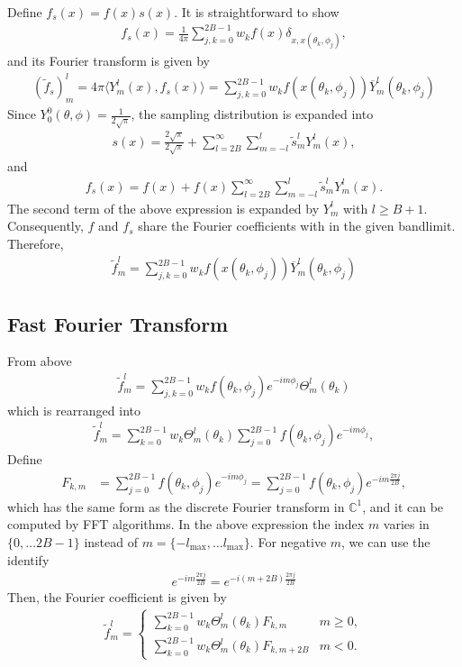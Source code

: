 \documentclass[onecolumn,11pt]{IEEEtran}
\newcommand{\pair}[1]{\ensuremath{\langle #1 \rangle}}
\begin{document}
Define $f_s(x)= f(x) s(x)$. It is straightforward to show
\begin{align*}
    f_s(x) = \frac{1}{4\pi}\sum_{j,k=0}^{2B-1} w_k f(x) \delta_{x, x(\theta_k,\phi_j)},
\end{align*}
and its Fourier transform is given by
\begin{align}
    (\tilde f_s)^l_m = 4\pi \pair{ Y^l_m(x), f_s(x) } =  \sum_{j,k=0}^{2B-1} w_k f(x(\theta_k,\phi_j)) \overline{Y}^l_m(\theta_k,\phi_j)
\end{align}
Since $Y^0_0(\theta,\phi)= \frac{1}{2\sqrt{\pi}}$, the sampling distribution is expanded into
\begin{align*}
    s(x) = \frac{2\sqrt{\pi}}{2\sqrt{\pi}} + \sum_{l=2B}^\infty \sum_{m=-l}^l \tilde s^l_m Y^l_m(x),
\end{align*}
and
\begin{align*}
    f_s(x) = f(x) + f(x)\sum_{l=2B}^\infty \sum_{m=-l}^l \tilde s^l_m Y^l_m(x).
\end{align*}
The second term of the above expression is expanded by $Y^l_m$ with $l\geq B+1$. 
Consequently, $f$ and $f_s$ share the Fourier coefficients with in the given bandlimit.
Therefore,
\begin{align}
    \tilde f^l_m = \sum_{j,k=0}^{2B-1} w_k f(x(\theta_k,\phi_j)) \overline{Y}^l_m(\theta_k,\phi_j)
\end{align}

\subsection{Fast Fourier Transform}
From above
\begin{align}
    \tilde f^l_m = \sum_{j,k=0}^{2B-1} w_k f(\theta_k,\phi_j) e^{-im\phi_j} \Theta^l_m(\theta_k)
\end{align}
which is rearranged into
\begin{align}
    \tilde f^l_m =  \sum_{k=0}^{2B-1} w_k \Theta^l_m(\theta_k) \sum_{j=0}^{2B-1} f(\theta_k,\phi_j) e^{-im\phi_j},
\end{align}
Define
\begin{align*}
    F_{k,m} & = \sum_{j=0}^{2B-1} f(\theta_k,\phi_j) e^{-im\phi_j} = \sum_{j=0}^{2B-1} f(\theta_k,\phi_j) e^{-im \frac{2\pi j}{2B}},
\end{align*}
which has the same form as the discrete Fourier transform in $\mathbb{C}^1$, and it can be computed by FFT algorithms. 
In the above expression the index $m$ varies in $\{0,\ldots 2B-1\}$ instead of $m=\{-l_{\max},\ldots l_{\max}\}$. 
For negative $m$, we can use the identify
\begin{align*}
    e^{-im \frac{2\pi j}{2B}} = e^{-i(m+2B) \frac{2\pi j}{2B}}
\end{align*}
Then, the Fourier coefficient is given by
\begin{align}
    \tilde f^l_m = 
    \begin{cases}
        \sum_{k=0}^{2B-1} w_k \Theta^l_m(\theta_k)   F_{k,m} & m\geq 0,\\
        \sum_{k=0}^{2B-1} w_k \Theta^l_m(\theta_k)   F_{k,m+2B} & m< 0.
    \end{cases}
\end{align}
\end{document}
